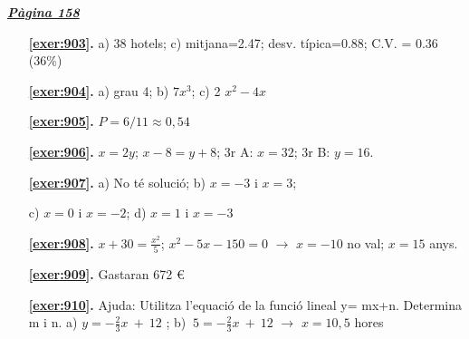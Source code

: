 
\hyperlink{page.158}{\textbf{\em Pàgina 158}}
\begin{enumerate}
\item[\fontfamily{phv}\selectfont\color{blue}\textbf{\ref{exer:903}. }] \label{ans:903} 
 a) 38 hotels; c) mitjana=2.47; desv. típica=0.88; C.V. = 0.36 (36\%)
 \end{enumerate}
\begin{enumerate}
\item[\fontfamily{phv}\selectfont\color{blue}\textbf{\ref{exer:904}. }] \label{ans:904} 
 a) grau 4; \quad b) $7x^{3}$; \quad c) 2 $x^{2}-4x$
\item[\fontfamily{phv}\selectfont\color{blue}\textbf{\ref{exer:905}. }] \label{ans:905} 
 $P=6/11 \approx 0,54$
\item[\fontfamily{phv}\selectfont\color{blue}\textbf{\ref{exer:906}. }] \label{ans:906} 
 $x=2y$; $x -8 = y+8$; \quad 3r A: $x= 32$; \quad 3r B: $y=16$.
\item[\fontfamily{phv}\selectfont\color{blue}\textbf{\ref{exer:907}. }] \label{ans:907} 
 a) No té solució; \quad b) $x=-3$ i $x=3$; \par c) $x=0$ i $x=-2$; \quad d) $x=1$ i $x=-3$
\item[\fontfamily{phv}\selectfont\color{blue}\textbf{\ref{exer:908}. }] \label{ans:908} 
 $x+30=\frac {x^2}{5}$; $x^2-5x-150=0$ $\rightarrow $ $x=-10$ no val; $x=15$ anys.
\item[\fontfamily{phv}\selectfont\color{blue}\textbf{\ref{exer:909}. }] \label{ans:909} 
 Gastaran 672 \euro {} 
\item[\fontfamily{phv}\selectfont\color{blue}\textbf{\ref{exer:910}. }] \label{ans:910} 
Ajuda: Utilitza l'equació de la funció lineal y= mx+n. Determina m i n. a) $y=-\frac {2}{3}x\ +\ 12$ ; \quad b) $\ 5=-\frac {2}{3}x\ +\ 12$ $\rightarrow $ $x=10,5$ hores
 \end{enumerate}
\vspace{0.3cm}


